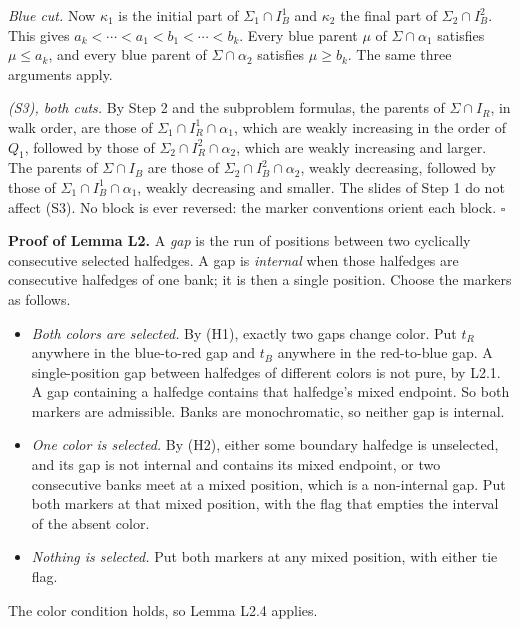 \documentclass[
  11pt,
]{article}
\providecommand{\tightlist}{%
  \setlength{\itemsep}{0pt}\setlength{\parskip}{0pt}}
\begin{document}
\emph{Blue cut.} Now \(\kappa_1\) is the initial part of
\(\Sigma_1\cap I_B^1\) and \(\kappa_2\) the final part of
\(\Sigma_2\cap I_B^2\). This gives \(a_k<\cdots<a_1<b_1<\cdots<b_k\).
Every blue parent \(\mu\) of \(\Sigma\cap\alpha_1\) satisfies
\(\mu\le a_k\), and every blue parent of \(\Sigma\cap\alpha_2\)
satisfies \(\mu\ge b_k\). The same three arguments apply.

\emph{(S3), both cuts.} By Step 2 and the subproblem formulas, the
parents of \(\Sigma\cap I_R\), in walk order, are those of
\(\Sigma_1\cap I^1_R\cap\alpha_1\), which are weakly increasing in the
order of \(Q_1\), followed by those of
\(\Sigma_2\cap I^2_R\cap\alpha_2\), which are weakly increasing and
larger. The parents of \(\Sigma\cap I_B\) are those of
\(\Sigma_2\cap I^2_B\cap\alpha_2\), weakly decreasing, followed by those
of \(\Sigma_1\cap I^1_B\cap\alpha_1\), weakly decreasing and smaller.
The slides of Step 1 do not affect (S3). No block is ever reversed: the
marker conventions orient each block. \(\square\)

\textbf{Proof of Lemma L2.} A \emph{gap} is the run of positions between
two cyclically consecutive selected halfedges. A gap is \emph{internal}
when those halfedges are consecutive halfedges of one bank; it is then a
single position. Choose the markers as follows.

\begin{itemize}
\tightlist
\item
  \emph{Both colors are selected.} By (H1), exactly two gaps change
  color. Put \(t_R\) anywhere in the blue-to-red gap and \(t_B\)
  anywhere in the red-to-blue gap. A single-position gap between
  halfedges of different colors is not pure, by L2.1. A gap containing a
  halfedge contains that halfedge's mixed endpoint. So both markers are
  admissible. Banks are monochromatic, so neither gap is internal.
\item
  \emph{One color is selected.} By (H2), either some boundary halfedge
  is unselected, and its gap is not internal and contains its mixed
  endpoint, or two consecutive banks meet at a mixed position, which is
  a non-internal gap. Put both markers at that mixed position, with the
  flag that empties the interval of the absent color.
\item
  \emph{Nothing is selected.} Put both markers at any mixed position,
  with either tie flag.
\end{itemize}

The color condition holds, so Lemma L2.4 applies.
\end{document}
